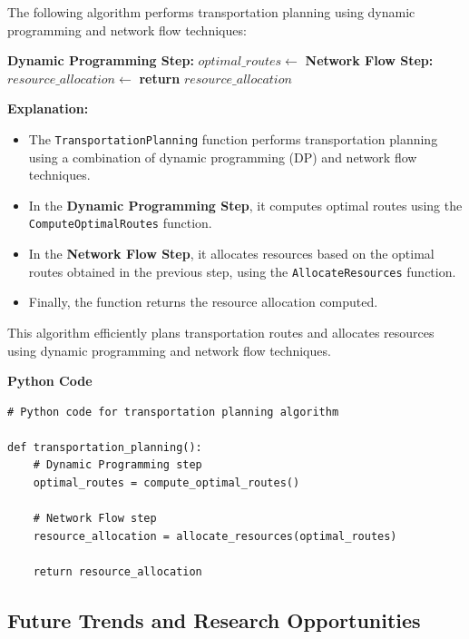\documentclass[12pt]{book} %
\begin{document}
The following algorithm performs transportation planning using dynamic programming and network flow techniques:
\FloatBarrier
\begin{algorithm}
\caption{Transportation Planning}\label{transportation-planning}
\begin{algorithmic}[1]
    \State \textbf{Dynamic Programming Step:}
    \State $optimal\_routes \gets$ 
    \State \textbf{Network Flow Step:}
    \State $resource\_allocation \gets$ 
    \State \textbf{return} $resource\_allocation$
\EndProcedure
\end{algorithmic}
\end{algorithm}
\FloatBarrier
\textbf{Explanation:}
\begin{itemize}
    \item The \texttt{TransportationPlanning} function performs transportation planning using a combination of dynamic programming (DP) and network flow techniques.
    \item In the \textbf{Dynamic Programming Step}, it computes optimal routes using the \texttt{ComputeOptimalRoutes} function.
    \item In the \textbf{Network Flow Step}, it allocates resources based on the optimal routes obtained in the previous step, using the \texttt{AllocateResources} function.
    \item Finally, the function returns the resource allocation computed.
\end{itemize}

This algorithm efficiently plans transportation routes and allocates resources using dynamic programming and network flow techniques.


\textbf{Python Code}

\FloatBarrier
\begin{lstlisting}
# Python code for transportation planning algorithm

def transportation_planning():
    # Dynamic Programming step
    optimal_routes = compute_optimal_routes()
    
    # Network Flow step
    resource_allocation = allocate_resources(optimal_routes)
    
    return resource_allocation
\end{lstlisting}
\FloatBarrier

\subsection{Future Trends and Research Opportunities}
\end{document}
